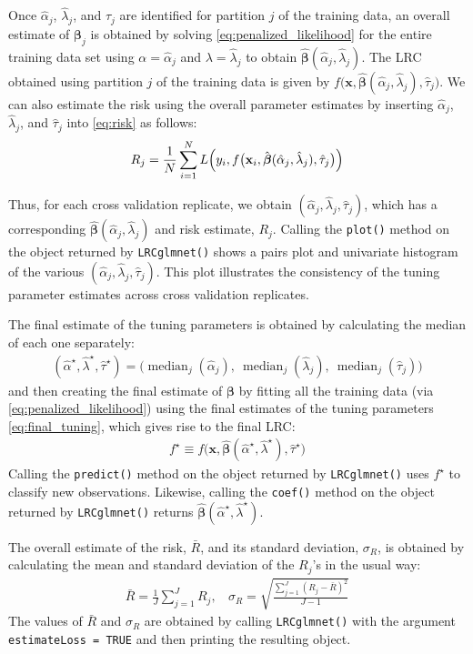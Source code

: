 \documentclass{article}
\DeclareMathOperator*{\median}{median}
\begin{document}
Once $\hat\alpha_j$, $\hat\lambda_j$, and $\hat\tau_j$ are identified for partition $j$ of the training data, 
an overall estimate of $\boldsymbol\beta_j$ is obtained by
solving \eqref{eq:penalized_likelihood} for the entire training data set using $\alpha = \hat\alpha_j$ and $\lambda = \hat\lambda_j$ 
to obtain $\hat{\boldsymbol\beta}(\hat\alpha_j,\hat\lambda_j)$.  The LRC obtained using partition $j$ of the
training data is given by $f \bigl( \mathbf{x},\hat{\boldsymbol{\beta}}(\hat\alpha_j,\hat\lambda_j),\hat\tau_j \bigr)$.  We can
also estimate the risk using the overall parameter estimates by inserting $\hat\alpha_j$, $\hat\lambda_j$, and $\hat\tau_j$ 
into
\eqref{eq:risk} as follows:
\begin{align}
\label{eq:final_risk_j}
R_j  = \frac{1}{N}\sum_{i=1}^N L \Bigl(y_i, f\bigl(\mathbf{x}_i,
\hat{\boldsymbol{\beta}}(\hat\alpha_j,\hat\lambda_j), \hat\tau_j \bigr) \Bigr)
\end{align}

Thus, for each cross validation replicate, we obtain 
$(\hat\alpha_j, \hat\lambda_j, \hat\tau_j)$, which has a corresponding $\hat{\boldsymbol\beta}(\hat\alpha_j,\hat\lambda_j)$ 
and risk estimate, $R_j$. Calling the {\tt plot()} method
on the object returned by {\tt LRCglmnet()} shows a pairs plot and univariate histogram of the
various $(\hat\alpha_j, \hat\lambda_j, \hat\tau_j)$.  This plot illustrates the consistency of the tuning parameter estimates 
across cross validation replicates.

The final estimate of the tuning parameters is obtained by calculating the median of each one separately:
\begin{align}
\label{eq:final_tuning}
(\hat\alpha^\star,\hat\lambda^\star,\hat\tau^\star) = \bigl(\median_j(\hat\alpha_j), ~\median_j(\hat\lambda_j),
  ~\median_j(\hat\tau_j) \bigr)
\end{align}
\noindent and then creating the final estimate of $\boldsymbol\beta$ by fitting all the training 
data (via \eqref{eq:penalized_likelihood}) using the final estimates of the tuning parameters \eqref{eq:final_tuning}, 
which gives rise to the final LRC:
\begin{align}
f^\star \equiv f \bigl(\mathbf{x},\hat{\boldsymbol{\beta}}(\hat\alpha^\star,\hat\lambda^\star), \hat\tau^\star \bigr)
\end{align}
\noindent Calling the {\tt predict()} method on the object returned by {\tt LRCglmnet()} uses $f^\star$ to classify
new observations.  Likewise, calling the {\tt coef()} method on the object returned by {\tt LRCglmnet()} returns 
$\hat{\boldsymbol\beta}(\hat\alpha^\star,\hat\lambda^\star)$.

The overall estimate of the risk, $\bar{R}$, and its standard deviation, $\sigma_R$, is obtained by calculating 
the mean and standard deviation of the $R_j$'s in the usual way:
\begin{align}
\bar{R} = \frac{1}{J}\sum_{j=1}^J R_j,  ~~~~ \sigma_R = \sqrt{\frac{\sum_{j=1}^J(R_j - \bar{R})^2}{J-1}}
\end{align}
The values of $\bar{R}$ and $\sigma_R$ are obtained by calling {\tt LRCglmnet()} with the argument {\tt estimateLoss = TRUE}
and then printing the resulting object.
\end{document}
